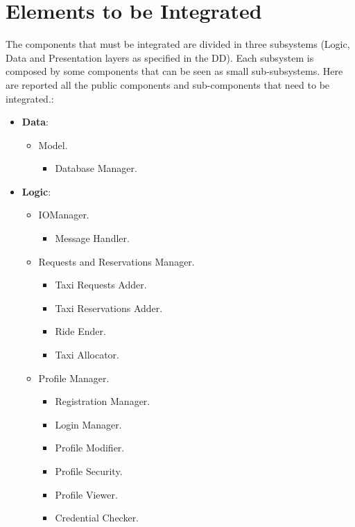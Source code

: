 \documentclass[../../../../testPlan.tex]{subfiles}
\begin{document}
	\section{Elements to be Integrated}
		The components that must be integrated are divided in three subsystems (Logic, Data and Presentation layers as specified in the DD). Each subsystem is composed by some components that can be seen as small sub-subsystems. Here are reported all the public components and sub-components that need to be integrated.:
		\begin{itemize}
			\item \textbf{Data}:
			      \begin{itemize}
			      	\item Model.
			      		  \begin{itemize}
			      			\item Database Manager.
			      		  \end{itemize}
			      \end{itemize}
			\item \textbf{Logic}:
			      \begin{itemize}
			      	\item IOManager.
			      		  \begin{itemize}
			      		  	\item Message Handler.
			      		  \end{itemize}
			      	\item Requests and Reservations Manager.
			      		  \begin{itemize}
			      		  	\item Taxi Requests Adder.
			      		  	\item Taxi Reservations Adder.
			      		  	\item Ride Ender.
			      		  	\item Taxi Allocator.
			      		  \end{itemize}
			      	\item Profile Manager.
			      		  \begin{itemize}
			      		  	\item Registration Manager.
			      		  	\item Login Manager.
			      		  	\item Profile Modifier.
			      		  	\item Profile Security.
			      		  	\item Profile Viewer.
			      		  	\item Credential Checker.
			      		  \end{itemize}

\end{itemize}
\end{itemize}
\end{document}
